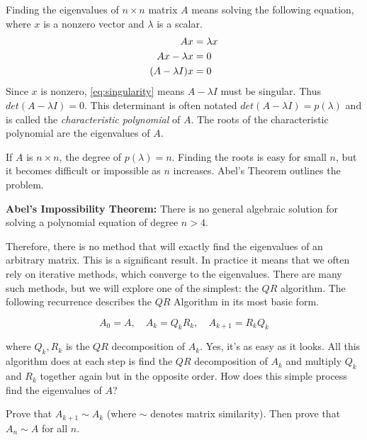 \label{Ch:EigSolve}


Finding the eigenvalues of $n \times n$ matrix $A$ means solving the following equation, where $x$ is a nonzero vector and $\lambda$ is a scalar.
\begin{align} 
 A x                       &=  \lambda x  \notag \\
A x - \lambda x &= 0 \notag \\
(A - \lambda I)x  &= 0 \label{eq:singularity}
\end{align}
Since $x$ is nonzero, \eqref{eq:singularity} means $A-\lambda I$ must be singular. Thus $det(A-\lambda I) = 0$.  This determinant is often notated $det(A-\lambda I) = p(\lambda)$ and is called the \emph{characteristic polynomial} of $A$. The roots of the characteristic polynomial are the eigenvalues of $A$.

If $A$ is $n \times n$, the degree of $p(\lambda) = n$.   Finding the roots is easy for small $n$, but it becomes difficult or impossible as $n$ increases.  Abel's Theorem  outlines the problem.

\begin{theorem}
\label{Theorem:Abel}
{\bf Abel's Impossibility Theorem:} There is no general algebraic solution for solving a polynomial equation of degree $n>4$.
\end{theorem}

Therefore, there is no method that will exactly find the eigenvalues of an arbitrary matrix. This is a significant result. In practice it means that we often rely on iterative methods, which converge to the eigenvalues. There are many such methods, but we will explore one of the simplest: the $QR$ algorithm. The following recurrence describes the $QR$ Algorithm in its most basic form. 

\begin{equation*}
A_0 = A, \quad A_k = Q_k R_k, \quad A_{k+1} = R_k Q_k
\end{equation*}

where $Q_k, R_k$ is the $QR$ decomposition of $A_k$. Yes, it's as easy as it looks. All this algorithm does at each step is find the $QR$ decomposition of $A_k$ and multiply $Q_k$ and $R_k$ together again but in the opposite order. How does this simple process find the eigenvalues of $A$? 

\begin{problem}
\label{problem:similarity proof}
Prove that $A_{k+1} \sim A_k$ (where $\sim$ denotes matrix similarity). Then prove that $A_n \sim A$ for all $n$.  
\end{problem}

